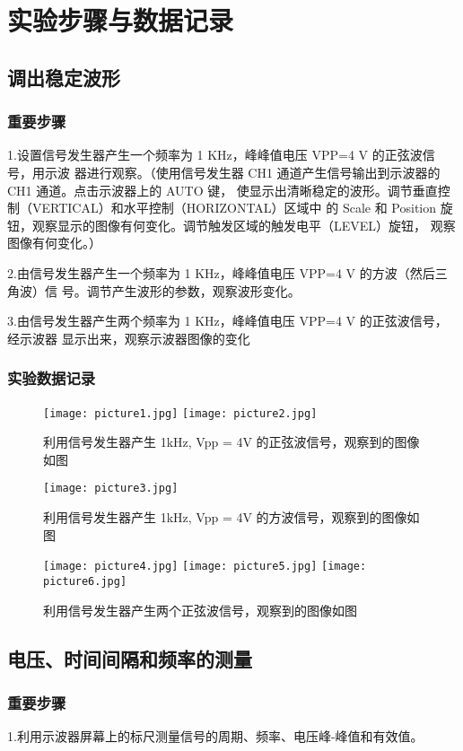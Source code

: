 \documentclass[11pt,a4paper]{article}
\begin{document}
\section{实验步骤与数据记录}
\subsection{调出稳定波形}
\subsubsection{重要步骤}
1.设置信号发生器产生一个频率为 1 KHz，峰峰值电压 VPP=4 V 的正弦波信号，用示波
器进行观察。（使用信号发生器 CH1 通道产生信号输出到示波器的 CH1 通道。点击示波器上的 AUTO 键，
使显示出清晰稳定的波形。调节垂直控制（VERTICAL）和水平控制（HORIZONTAL）区域中
的 Scale 和 Position 旋钮，观察显示的图像有何变化。调节触发区域的触发电平（LEVEL）旋钮，
观察图像有何变化。）

2.由信号发生器产生一个频率为 1 KHz，峰峰值电压 VPP=4 V 的方波（然后三角波）信
号。调节产生波形的参数，观察波形变化。

3.由信号发生器产生两个频率为 1 KHz，峰峰值电压 VPP=4 V 的正弦波信号，经示波器
显示出来，观察示波器图像的变化
\subsubsection{实验数据记录}
\begin{figure}[H]
    \centering
    \texttt{[image: picture1.jpg]}
    \texttt{[image: picture2.jpg]}
    \caption{利用信号发生器产生 1kHz, Vpp = 4V 的正弦波信号，观察到的图像如图}
\end{figure}
\begin{figure}[H]
    \centering
    \texttt{[image: picture3.jpg]}
    \caption{利用信号发生器产生 1kHz, Vpp = 4V 的方波信号，观察到的图像如图}
\end{figure}
\begin{figure}[H]
    \centering
    \texttt{[image: picture4.jpg]}
    \texttt{[image: picture5.jpg]}
    \texttt{[image: picture6.jpg]}
    \caption{利用信号发生器产生两个正弦波信号，观察到的图像如图}
\end{figure}
\subsection{电压、时间间隔和频率的测量}
\subsubsection{重要步骤}
1.利用示波器屏幕上的标尺测量信号的周期、频率、电压峰-峰值和有效值。
\end{document}
